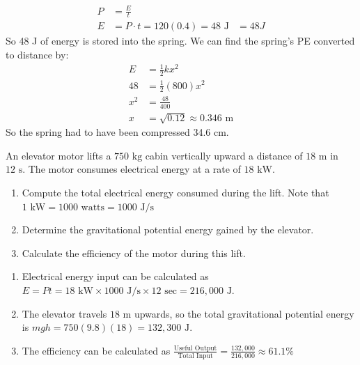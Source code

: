\begin{Answer}[ref=power2]
\begin{align*}
  P &= \frac{E}{t} \\
  E &= P\cdot t = 120 (0.4) = 48 \text{ J}
  &= 48 J
\end{align*}
So 48 J of energy is stored into the spring. We can find the spring's PE converted to distance by:
\begin{align*}
  E &= \frac{1}{2}kx^2\\
  48 &= \frac{1}{2}(800)x^2 \\
  x^2 &= \frac{48}{400} \\ 
  x &= \sqrt{0.12} \approx 0.346 \text{ m}
\end{align*}
So the spring had to have been compressed 34.6 cm.
\end{Answer}

\begin{Exercise}[title=Elevator Lift, label = elevatorPE]
An elevator motor lifts a $750 \text{ kg}$ cabin vertically upward a distance of $18 \text{ m}$ in $12 \text{ s}$. The motor consumes electrical energy at a rate of 
$18 \text{ kW}$. 

\begin{enumerate}[label=(\alph*)]
  \item Compute the total electrical energy consumed during the lift. Note that $1 \text{ kW} = 1000 \text{ watts} = 1000 \text{ J/s}$
  \item Determine the gravitational potential energy gained by the elevator.
  \item Calculate the efficiency of the motor during this lift.
\end{enumerate}

\end{Exercise}
\begin{Answer}[ref=elevatorPE]
  
\begin{enumerate}[label=(\alph*)]
  \item Electrical energy input can be calculated as $E= Pt = 18 \text{ kW} \times 1000 \text{ J/s} \times 12 \text{ sec} = 216,000 \text{ J}$. 
  \item The elevator travels $18 \text{ m}$ upwards, so the total gravitational potential energy is $mgh = 750(9.8)(18) = 132,300 \text{ J}$. 
  \item The efficiency can be calculated as $\frac{\text{Useful Output}}{\text{Total Input}} = \frac{132,000}{216,000} \approx 61.1\%$
\end{enumerate}
\end{Answer}
